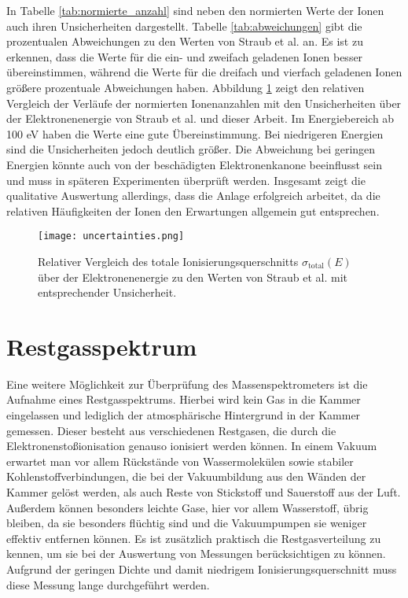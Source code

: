 In Tabelle \ref{tab:normierte_anzahl} sind neben den normierten Werte der Ionen auch ihren Unsicherheiten dargestellt. Tabelle \ref{tab:abweichungen} gibt die prozentualen Abweichungen zu den Werten von Straub et al. \cite{Straub} an. Es ist zu erkennen, dass die Werte für die ein- und zweifach geladenen Ionen besser übereinstimmen, während die Werte für die dreifach und vierfach geladenen Ionen größere prozentuale Abweichungen haben. Abbildung \ref{fig:uncertainties} zeigt den relativen Vergleich der Verläufe der normierten Ionenanzahlen mit den Unsicherheiten über der Elektronenenergie von Straub et al. und dieser Arbeit. Im Energiebereich ab 100 eV haben die Werte eine gute Übereinstimmung. Bei niedrigeren Energien sind die Unsicherheiten jedoch deutlich größer. Die Abweichung bei geringen Energien könnte auch von der beschädigten Elektronenkanone beeinflusst sein und muss in späteren Experimenten überprüft werden. Insgesamt zeigt die qualitative Auswertung allerdings, dass die Anlage erfolgreich arbeitet, da die relativen Häufigkeiten der Ionen den Erwartungen allgemein gut entsprechen.  


\begin{figure}
    \centering
    \texttt{[image: uncertainties.png]}
    \caption[Relativer Vergleich des totalen Ionisierungsquerschnitts mit Straub et al.]{Relativer Vergleich des totale Ionisierungsquerschnitts $\sigma_\text{total}(E)$ über der Elektronenenergie zu den Werten von Straub et al. \cite{Straub} mit entsprechender Unsicherheit.}
    \label{fig:uncertainties}
\end{figure}

\section{Restgasspektrum}
\label{sec:Restgasspektrum}
Eine weitere Möglichkeit zur Überprüfung des Massenspektrometers ist die Aufnahme eines Restgasspektrums. Hierbei wird kein Gas in die Kammer eingelassen und lediglich der atmosphärische Hintergrund in der Kammer gemessen. Dieser besteht aus verschiedenen Restgasen, die durch die Elektronenstoßionisation genauso ionisiert werden können. In einem Vakuum erwartet man vor allem Rückstände von Wassermolekülen sowie stabiler Kohlenstoffverbindungen, die bei der Vakuumbildung aus den Wänden der Kammer gelöst werden, als auch Reste von Stickstoff und Sauerstoff aus der Luft. Außerdem können besonders leichte Gase, hier vor allem Wasserstoff, übrig bleiben, da sie besonders flüchtig sind und die Vakuumpumpen sie weniger effektiv entfernen können. Es ist zusätzlich praktisch die Restgasverteilung zu kennen, um sie bei der Auswertung von Messungen berücksichtigen zu können. Aufgrund der geringen Dichte und damit niedrigem Ionisierungsquerschnitt muss diese Messung lange durchgeführt werden. 

